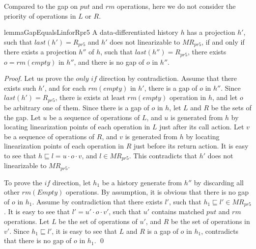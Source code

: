 Compared to the gap on $\textit{put}$ and $\textit{rm}$ operations, here we do not consider the priority of operations in $L$ or $R$.



\begin{restatable}{lemma}{GapEqualsLinforRpr5}
\label{lemma:Gap Equals Lin for Rpr5}
A data-differentiated history $h$ has a projection $h'$, such that $\textit{last}(h') = R_{\textit{pr5}}$ and $h'$ does not linearizable to $\textit{MR}_{\textit{pr5}}$, if and only if there exists a projection $h''$ of $h$, such that $\textit{last}(h'') = R_{\textit{pr5}}$, there exists $o = \textit{rm}(\textit{empty})$ in $h''$, and there is no gap of $o$ in $h''$.
\end{restatable}

\begin {proof}

Let us prove the $\textit{only if}$ direction by contradiction. Assume that there exists such $h'$, and for each $\textit{rm}(\textit{empty})$ in $h'$, there is a gap of $o$ in $h''$. Since $\textit{last}(h') = R_{\textit{pr5}}$, there is exists at least $\textit{rm}(\textit{empty})$ operation in $h$, and let $o$ be arbitrary one of them. Since there is a gap of $o$ in $h$, let $L$ and $R$ be the sets of the gap. Let $u$ be a sequence of operations of $L$, and $u$ is generated from $h$ by locating linearization points of each operation in $L$ just after its call action. Let $v$ be a sequence of operations of $R$, and $v$ is generated from $h$ by locating linearization points of each operation in $R$ just before its return action. It is easy to see that $h \sqsubseteq l = u \cdot o \cdot v$, and $l \in \textit{MR}_{\textit{pr5}}$. This contradicts that $h'$ does not linearizable to $\textit{MR}_{\textit{pr5}}$.

To prove the $\textit{if}$ direction, let $h_1$ be a history generate from $h''$ by discarding all other $\textit{rm}(\textit{Empty})$ operations. By assumption, it is obvious that there is no gap of $o$ in $h_1$. Assume by contradiction that there exists $l'$, such that $h_1 \sqsubseteq l' \in \textit{MR}_{\textit{pr5}}$. It is easy to see that $l' = u' \cdot o \cdot v'$, such that $u'$ contains matched $\textit{put}$ and $\textit{rm}$ operations. Let $L$ be the set of operations of $u'$, and $R$ be the set of operations in $v'$. Since $h_1 \sqsubseteq l'$, it is easy to see that $L$ and $R$ is a gap of $o$ in $h_1$, contradicts that there is no gap of $o$ in $h_1$. \qed
\end {proof}

